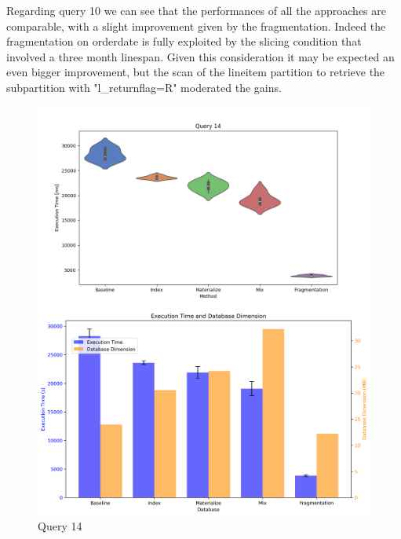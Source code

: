 Regarding query 10 we can see that the performances of all the approaches are comparable, with a slight improvement given by the fragmentation. Indeed the fragmentation on orderdate is fully exploited by the slicing condition that involved a three month linespan. Given this consideration it may be expected an even bigger improvement, but the scan of the lineitem partition to retrieve the subpartition with "l\_returnflag=R" moderated the gains.

\begin{figure}[h!] 
\centering 
\begin{minipage}{0.5\textwidth} 
\centering \includegraphics[width=\linewidth]{images/query14.png}  
\end{minipage}
\begin{minipage}{0.45\textwidth} 
\centering 
\includegraphics[width=\linewidth]{images/double_barplot_q14.png} 
\end{minipage} 
\caption{Query 14} 
\end{figure}

